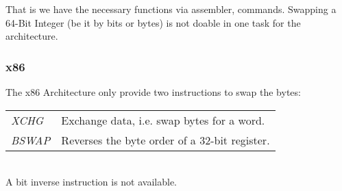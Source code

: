 \documentclass{article}
\begin{document}
That is we have the necessary functions via assembler, commands. Swapping a
64-Bit Integer (be it by bits or bytes) is not doable in one task for the
architecture. 
\subsubsection{x86}
The x86 Architecture only provide two instructions to swap the bytes:\\

\begin{tabular}{l | l}
  \textit{XCHG}  & Exchange data, i.e. swap bytes for a word.\\
  \textit{BSWAP} & Reverses the byte order of a 32-bit register.
\end{tabular}\\
A bit inverse instruction is not available.
 
\end{document}
